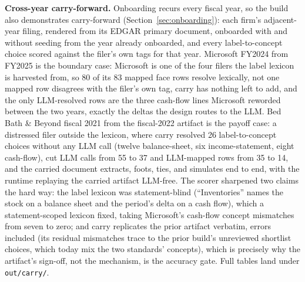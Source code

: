 \documentclass[11pt]{article}
\newcommand{\lead}[2]{\par\addvspace{5pt}\textbf{\textcolor{#1}{#2}}}
\begin{document}
\lead{navytwo}{Cross-year carry-forward.} Onboarding recurs every fiscal year, so the build also demonstrates carry-forward (Section~\ref{sec:onboarding}): each firm's adjacent-year filing, rendered from its EDGAR primary document, onboarded with and without seeding from the year already onboarded, and every label-to-concept choice scored against the filer's own tags for that year. Microsoft FY2024 from FY2025 is the boundary case: Microsoft is one of the four filers the label lexicon is harvested from, so 80 of its 83 mapped face rows resolve lexically, not one mapped row disagrees with the filer's own tag, carry has nothing left to add, and the only LLM-resolved rows are the three cash-flow lines Microsoft reworded between the two years, exactly the deltas the design routes to the LLM. Bed Bath \& Beyond fiscal 2021 from the fiscal-2022 artifact is the payoff case: a distressed filer outside the lexicon, where carry resolved 26 label-to-concept choices without any LLM call (twelve balance-sheet, six income-statement, eight cash-flow), cut LLM calls from 55 to 37 and LLM-mapped rows from 35 to 14, and the carried document extracts, foots, ties, and simulates end to end, with the runtime replaying the carried artifact LLM-free. The scorer sharpened two claims the hard way: the label lexicon was statement-blind (``Inventories'' names the stock on a balance sheet and the period's delta on a cash flow), which a statement-scoped lexicon fixed, taking Microsoft's cash-flow concept mismatches from seven to zero; and carry replicates the prior artifact verbatim, errors included (its residual mismatches trace to the prior build's unreviewed shortlist choices, which today mix the two standards' concepts), which is precisely why the artifact's sign-off, not the mechanism, is the accuracy gate. Full tables land under \texttt{out/carry/}.
\end{document}
